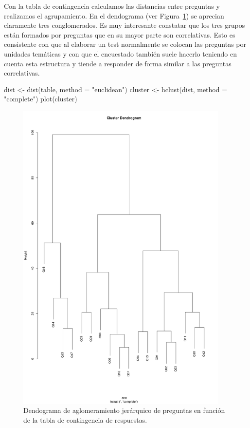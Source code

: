 \documentclass[
  12pt,
  a4paper,
  extrafontsizes,
  onecolumn,
  openright]{memoir}
\newenvironment{Shaded}{\begin{snugshade}}{\end{snugshade}}
\newcommand{\AttributeTok}[1]{\textcolor[rgb]{0.40,0.45,0.13}{#1}}
\newcommand{\FunctionTok}[1]{\textcolor[rgb]{0.28,0.35,0.67}{#1}}
\newcommand{\NormalTok}[1]{\textcolor[rgb]{0.00,0.23,0.31}{#1}}
\newcommand{\OtherTok}[1]{\textcolor[rgb]{0.00,0.23,0.31}{#1}}
\newcommand{\StringTok}[1]{\textcolor[rgb]{0.13,0.47,0.30}{#1}}
\begin{document}
\normalsize

Con la tabla de contingencia calculamos las distancias entre preguntas y
realizamos el agrupamiento. En el dendograma (ver
Figura~\ref{fig-dendo}) se aprecian claramente tres conglomerados. Es
muy interesante constatar que los tres grupos están formados por
preguntas que en su mayor parte son correlativas. Esto es consistente
con que al elaborar un test normalmente se colocan las preguntas por
unidades temáticas y con que el encuestado también suele hacerlo
teniendo en cuenta esta estructura y tiende a responder de forma similar
a las preguntas correlativas.

\begin{Shaded}
\begin{Highlighting}[]
\NormalTok{dist }\OtherTok{\textless{}{-}} \FunctionTok{dist}\NormalTok{(table, }\AttributeTok{method =} \StringTok{"euclidean"}\NormalTok{)}
\NormalTok{cluster }\OtherTok{\textless{}{-}} \FunctionTok{hclust}\NormalTok{(dist, }\AttributeTok{method =} \StringTok{"complete"}\NormalTok{)}
\FunctionTok{plot}\NormalTok{(cluster)}
\end{Highlighting}
\end{Shaded}

\begin{figure}[h]

{\centering \includegraphics[width=4.16667in,height=\textheight]{images/cluster.png}

}

\caption{\label{fig-dendo}Dendograma de aglomeramiento jerárquico de
preguntas en función de la tabla de contingencia de respuestas.}

\end{figure}
\end{document}
